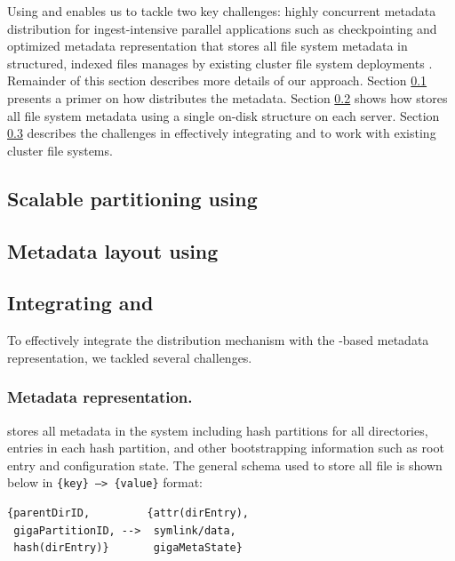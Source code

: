 Using \giga{} and \ldb{} enables us to tackle two key challenges: highly 
concurrent metadata distribution for ingest-intensive parallel applications
such as checkpointing \cite{PLFS} and 
optimized metadata representation that stores all file system
metadata in structured, indexed files manages by existing cluster file system
deployments \cite{LevelDB}. 
Remainder of this section describes more details of our approach. 
Section \ref{design.giga} presents a primer on how \giga{} distributes the
metadata. 
Section \ref{design.tablefs} shows how \ldb{} stores all file system metadata
using a single on-disk structure on each server. 
Section \ref{design.integration} describes the challenges in effectively
integrating \giga{} and \ldb{} to work with existing cluster file systems.

\subsection{Scalable partitioning using \giga{}}
\label{design.giga}


\subsection{Metadata layout using \ldb{}}
\label{design.tablefs}


\subsection{Integrating \giga{} and \ldb{}}
\label{design.integration}

To effectively integrate the \giga{} distribution mechanism with the
\ldb{}-based metadata representation, we tackled several challenges. 

\subsubsection*{Metadata representation.}

\ldb{} stores all metadata in the system including \giga{} hash
partitions for all directories, entries in each hash partition, and other
bootstrapping information such as root entry and \giga{} configuration state.
The general schema used to store all file is shown below in
\texttt{\{key\} --> \{value\}} format:

\begin{verbatim}
{parentDirID,         {attr(dirEntry),
 gigaPartitionID, -->  symlink/data,
 hash(dirEntry)}       gigaMetaState}
\end{verbatim}

